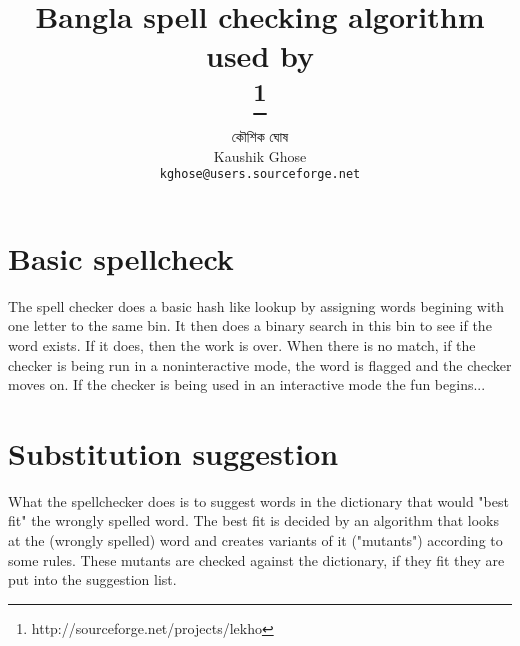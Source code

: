 \documentclass[11pt]{article}
\begin{document}
\title{Bangla spell checking algorithm used by\\ \footnote{http://sourceforge.net/projects/lekho}}
\author{ {\lbng কৌশিক ঘোষ}\\Kaushik Ghose\\{\tt kghose@users.sourceforge.net}}
\maketitle

\section{Basic spellcheck}
The spell checker does a basic hash like lookup by assigning words begining with one letter to the same bin. It then does a binary search in this bin to see if the word exists. If it does, then the work is over. When there is no match, if the checker is being run in a noninteractive mode, the word is flagged and the checker moves on. If the checker is being used in an interactive mode the fun begins... 

\section{Substitution suggestion}
What the spellchecker does is to suggest words in the dictionary that would "best fit" the wrongly spelled word. The best fit is decided by an algorithm that looks at the (wrongly spelled) word and creates variants of it ("mutants") according to some rules. These mutants are checked against the dictionary, if they fit they are put into the suggestion list.
\end{document}
